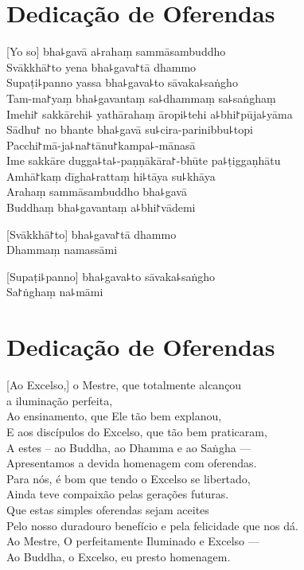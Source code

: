 \chapter*{Dedicação de Oferendas}

\delegateSetUseNext

[Yo so] bha꜕gavā a꜕rahaṃ sammāsambuddho\\
Svākkhā꜓to yena bha꜕gava꜓tā dhammo\\
Supaṭi꜕panno yassa bha꜕gava꜕to sāvaka꜕saṅgho\\
Tam-ma꜓yaṃ bha꜕gavantaṃ sa꜕dhammaṃ sa꜕saṅghaṃ\\
Imehi꜓ sakkārehi꜕ yathārahaṃ āropi꜕tehi a꜕bhi꜓pūja꜕yāma\\
Sādhu꜓ no bhante bha꜕gavā su꜕cira-parinibbu꜕topi\\
Pacchi꜓mā-ja꜕na꜓tānu꜓kampa꜕-mānasā\\
Ime sakkāre dugga꜕ta꜕-paṇṇākāra꜓-bhūte pa꜕ṭiggaṇhātu\\
Amhā꜓kaṃ dīgha꜕rattaṃ hi꜕tāya su꜕khāya\\
Arahaṃ sammāsambuddho bha꜕gavā\\
Buddhaṃ bha꜕gavantaṃ a꜕bhi꜓vādemi 

[Svākkhā꜓to] bha꜕gava꜓tā dhammo\\
Dhammaṃ namassāmi 

[Supaṭi꜕panno] bha꜕gava꜕to sāvaka꜕saṅgho\\
Sa꜓ṅghaṃ na꜕māmi 

\clearpage

\chapter{Dedicação de Oferendas}

[Ao Excelso,] o Mestre, que totalmente alcançou\\
\vin a iluminação perfeita,\\
Ao ensinamento, que Ele tão bem explanou,\\
E aos discípulos do Excelso, que tão bem praticaram,\\
A estes – ao Buddha, ao Dhamma e ao Saṅgha ---\\
Apresentamos a devida homenagem com oferendas.\\
Para nós, é bom que tendo o Excelso se libertado,\\
Ainda teve compaixão pelas gerações futuras.\\
Que estas simples oferendas sejam aceites\\
Pelo nosso duradouro benefício e pela felicidade que nos dá.\\
Ao Mestre, O perfeitamente Iluminado e Excelso ---\\
Ao Buddha, o Excelso, eu presto homenagem. 

